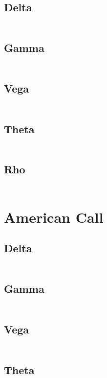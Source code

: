 \documentclass[12pt,a4paper]{article}
\begin{document}
\subsection{Delta}
\[
\begin{aligned}  
\end{aligned}
\]
\subsection{Gamma}
\[
\begin{aligned}  
\end{aligned}
\]
\subsection{Vega}
\[
\begin{aligned}  
\end{aligned}
\]
\subsection{Theta}
\[
\begin{aligned}  
\end{aligned}
\]
\subsection{Rho}
\[
\begin{aligned}  
\end{aligned}
\]

\section{American Call}
\subsection{Delta}
\[
\begin{aligned}  
\end{aligned}
\]
\subsection{Gamma}
\[
\begin{aligned}  
\end{aligned}
\]
\subsection{Vega}
\[
\begin{aligned}  
\end{aligned}
\]
\subsection{Theta}
\[
\begin{aligned}  
\end{aligned}
\]
\end{document}

